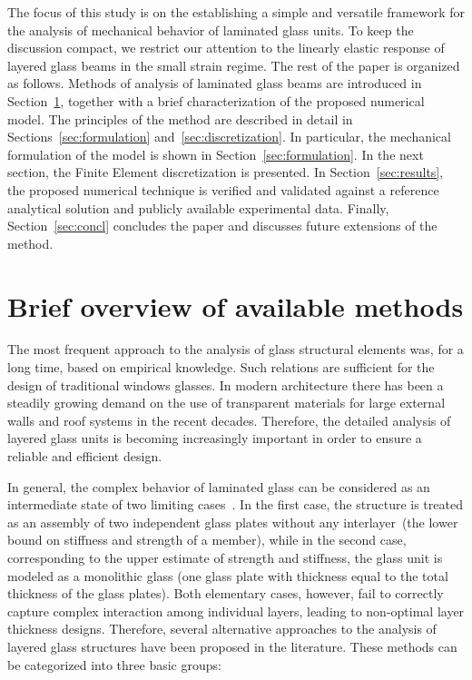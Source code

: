 \documentclass[times,a4paper,12pt]{elsarticle}
\begin{document}
The focus of this study is on the establishing a simple and versatile
framework for the analysis of mechanical behavior of laminated glass
units. To keep the discussion compact, we restrict our attention to
the linearly elastic response of layered glass beams in the small
strain regime. The rest of the paper is organized as follows. Methods
of analysis of laminated glass beams are introduced in
Section~\ref{sec:method}, together with a brief characterization of
the proposed numerical model. The principles of the method are
described in detail in Sections~\ref{sec:formulation}
and~\ref{sec:discretization}. In particular, the mechanical
formulation of the model is shown in Section~\ref{sec:formulation}. In
the next section, the Finite Element discretization is presented. In
Section~\ref{sec:results}, the proposed numerical technique is
verified and validated against a reference analytical solution and
publicly available experimental data. Finally, Section~\ref{sec:concl}
concludes the paper and discusses future extensions of the method.

\section{Brief overview of available methods}\label{sec:method}
The most frequent approach to the analysis of glass structural
elements was, for a long time, based on empirical knowledge. Such
relations are sufficient for the design of traditional windows
glasses. In modern architecture there has been a steadily growing
demand on the use of transparent materials for large external walls
and roof systems in the recent decades. Therefore, the detailed
analysis of layered glass units is becoming increasingly important in
order to ensure a reliable and efficient design.

In general, the complex behavior of laminated glass can be considered
as an intermediate state of two limiting
cases~\cite{Vallabhan:1987:SLG}. In the first case, the structure is
treated as an assembly of two independent glass plates without any
interlayer~(the lower bound on stiffness and strength of a member),
while in the second case, corresponding to the upper estimate of
strength and stiffness, the glass unit is modeled as a monolithic
glass (one glass plate with thickness equal to the total thickness of
the glass plates).  Both elementary cases, however, fail to correctly
capture complex interaction among individual layers, leading to
non-optimal layer thickness designs. Therefore, several alternative
approaches to the analysis of layered glass structures have been
proposed in the literature. These methods can be categorized into
three basic groups:
\end{document}
